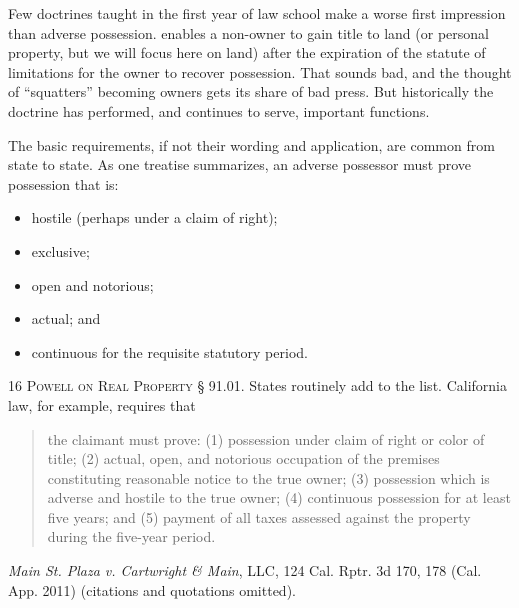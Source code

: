 Few doctrines taught in the first year of law school make a worse first
impression than adverse possession.  enables a non-owner to
gain title to land (or personal property, but we will focus here on land) after
the expiration of the statute of limitations for the owner to recover
possession. That sounds bad, and the thought of ``squatters'' becoming owners
gets its share of bad press. But historically the doctrine has performed, and
continues to serve, important functions. 

The basic requirements, if not their wording and application, are common from
state to state. As one treatise summarizes, an adverse possessor must prove
possession that is:
\begin{itemize}
\item hostile (perhaps under a claim of right);

\item exclusive;

\item open and notorious;

\item actual; and

\item continuous for the requisite statutory period.
\end{itemize}
16 \textsc{Powell on Real Property} {\S} 91.01. States routinely add to the
list. California law, for example, requires that 
\begin{quote}
the claimant must prove: (1) possession under claim of right or color of title;
(2) actual, open, and notorious occupation of the premises constituting
reasonable notice to the true owner; (3) possession which is adverse and
hostile to the true owner; (4) continuous possession for at least five years;
and (5) payment of all taxes assessed against the property during the five-year
period.
\end{quote}
\emph{Main St. Plaza v. Cartwright \& Main}, LLC, 124 Cal. Rptr. 3d 170, 178
(Cal. App. 2011) (citations and quotations omitted).


